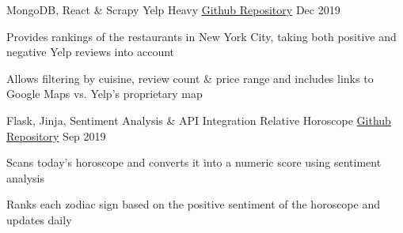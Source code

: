 

\begin{cventries}


  \cventry
  {MongoDB, React \& Scrapy} %
  {Yelp Heavy} %
  {\href{https://github.com/ysmike/yelp-heavy}{Github Repository}} %
  {Dec 2019} %
  {
    \begin{cvitems} %
      \item {Provides rankings of the restaurants in New York City, taking both positive and negative Yelp reviews into account}
      \item {Allows filtering by cuisine, review count \& price range and includes links to Google Maps vs. Yelp's proprietary map}
    \end{cvitems}
  }

  \cventry
  {Flask, Jinja, Sentiment Analysis \& API Integration} %
  {Relative Horoscope} %
  {\href{https://github.com/ysmike/relative-horoscope}{Github Repository}} %
  {Sep 2019} %
  {
    \begin{cvitems} %
      \item {Scans today's horoscope and converts it into a numeric score using sentiment analysis}
      \item {Ranks each zodiac sign based on the positive sentiment of the horoscope and updates daily}
    \end{cvitems}
  }

\end{cventries}